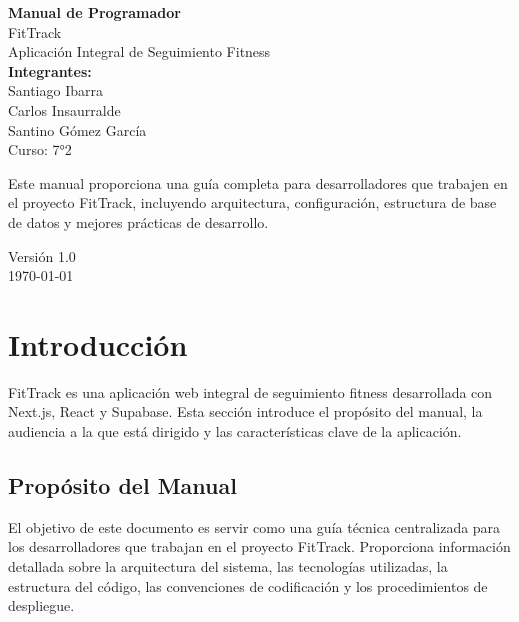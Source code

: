 \documentclass[12pt,a4paper]{article}
\begin{document}
\begin{titlepage}
\centering
\vspace*{2cm}

{\Huge\bfseries Manual de Programador}\\[0.5cm]
{\LARGE FitTrack}\\[1cm]

{\large Aplicación Integral de Seguimiento Fitness}\\[2cm]

\textbf{Integrantes:} \\[0.3cm]
Santiago Ibarra \\[0.2cm]
Carlos Insaurralde \\[0.2cm]
Santino Gómez García \\[0.2cm]
Curso: 7°2 \\

\vspace*{2cm}


\begin{minipage}{0.8\textwidth}
\centering
Este manual proporciona una guía completa para desarrolladores que trabajen en el proyecto FitTrack, incluyendo arquitectura, configuración, estructura de base de datos y mejores prácticas de desarrollo.
\end{minipage}

\vfill

{\large Versión 1.0}\\[0.5cm]
{\large \today}

\end{titlepage}

\tableofcontents

\newpage


\section{Introducción}

FitTrack es una aplicación web integral de seguimiento fitness desarrollada con Next.js, React y Supabase. Esta sección introduce el propósito del manual, la audiencia a la que está dirigido y las características clave de la aplicación.

\subsection{Propósito del Manual}
El objetivo de este documento es servir como una guía técnica centralizada para los desarrolladores que trabajan en el proyecto FitTrack. Proporciona información detallada sobre la arquitectura del sistema, las tecnologías utilizadas, la estructura del código, las convenciones de codificación y los procedimientos de despliegue.
\end{document}
